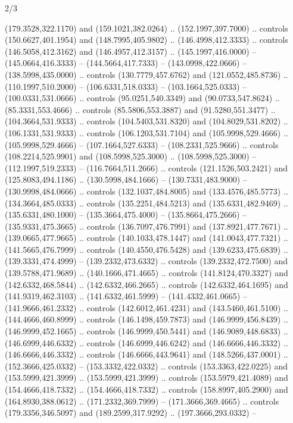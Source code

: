 \begin{flagdescription}{2/3}
\begin{scope}[xshift=0.5\flaglength,yshift=0.5\flagwidth,scale=\flagwidth/525.28]
\begin{scope}[y=0.1mm, x=0.1mm, yscale=-1,shift={(-381.5,-404)}]
\begin{scope}[shift={(5.25001,4.53053)},miter limit=4.00,line width=0.800\lw]
  (179.3528,322.1170) and (159.1021,382.0264) .. (152.1997,397.7000) .. controls
  (150.6627,401.1954) and (148.7995,405.9802) .. (146.4998,412.3333) .. controls
  (146.5058,412.3162) and (146.4957,412.3157) .. (145.1997,416.0000) --
  (145.0664,416.3333) -- (144.5664,417.7333) -- (143.0998,422.0666) --
  (138.5998,435.0000) .. controls (130.7779,457.6762) and (121.0552,485.8736) ..
  (110.1997,510.2000) -- (106.6331,518.0333) -- (103.1664,525.0333) --
  (100.0331,531.0666) .. controls (95.0251,540.3349) and (90.0733,547.8624) ..
  (85.3331,553.4666) .. controls (85.5806,553.3887) and (91.5280,551.3477) ..
  (104.3664,531.9333) .. controls (104.5403,531.8320) and (104.8029,531.8202) ..
  (106.1331,531.9333) .. controls (106.1203,531.7104) and (105.9998,529.4666) ..
  (105.9998,529.4666) -- (107.1664,527.6333) -- (108.2331,525.9666) .. controls
  (108.2214,525.9901) and (108.5998,525.3000) .. (108.5998,525.3000) --
  (112.1997,519.2333) -- (116.7664,511.2666) .. controls (121.1526,503.2421) and
  (125.8083,494.1186) .. (130.5998,484.1666) -- (130.7331,483.9000) --
  (130.9998,484.0666) .. controls (132.1037,484.8005) and (133.4576,485.5773) ..
  (134.3664,485.0333) .. controls (135.2251,484.5213) and (135.6331,482.9469) ..
  (135.6331,480.1000) -- (135.3664,475.4000) -- (135.8664,475.2666) --
  (135.9331,475.3665) .. controls (136.7097,476.7991) and (137.8921,477.7671) ..
  (139.0665,477.9665) .. controls (140.1033,478.1447) and (141.0043,477.7321) ..
  (141.5665,476.7999) .. controls (140.4550,476.5428) and (139.6233,475.6839) ..
  (139.3331,474.4999) -- (139.2332,473.6332) .. controls (139.2332,472.7500) and
  (139.5788,471.9689) .. (140.1666,471.4665) .. controls (141.8124,470.3327) and
  (142.6332,468.5844) .. (142.6332,466.2665) .. controls (142.6332,464.1695) and
  (141.9319,462.3103) .. (141.6332,461.5999) -- (141.4332,461.0665) --
  (141.9666,461.2332) .. controls (142.6012,461.4231) and (143.5460,461.5100) ..
  (144.4666,460.8999) .. controls (146.1498,459.7873) and (146.9999,456.8439) ..
  (146.9999,452.1665) .. controls (146.9999,450.5441) and (146.9089,448.6833) ..
  (146.6999,446.6332) .. controls (146.6999,446.6242) and (146.6666,446.3332) ..
  (146.6666,446.3332) .. controls (146.6666,443.9641) and (148.5266,437.0001) ..
  (152.3666,425.0332) -- (153.3332,422.0332) .. controls (153.3363,422.0225) and
  (153.5999,421.3999) .. (153.5999,421.3999) .. controls (153.5979,421.4089) and
  (154.4666,418.7332) .. (154.4666,418.7332) .. controls (158.8997,405.2900) and
  (164.8930,388.0612) .. (171.2332,369.7999) -- (171.3666,369.4665) .. controls
  (179.3356,346.5097) and (189.2599,317.9292) .. (197.3666,293.0332) --

\end{scope}
\end{scope}
\end{scope}
\end{flagdescription}
